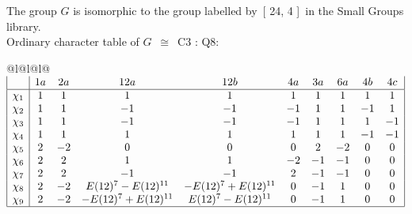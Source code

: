 \documentclass[varwidth=\maxdimen,border=10]{standalone}
\begin{document}
The group $G$ is isomorphic to the group labelled by\ [ 24, 4 ]\ in the Small Groups library.\\
Ordinary character table of $G$\ $\cong$\ C3 : Q8:\\
\begin{center}
\begin{tabular}{@{}l@{}l@{}l@{}}
\hline
\(\begin{array}{|l|ccccccccc|}
  & 1a & 2a & 12a & 12b & 4a & 3a & 6a & 4b & 4c\\ \hline
\chi_{1} & 1 & 1 & 1 & 1 & 1 & 1 & 1 & 1 & 1\\
\chi_{2} & 1 & 1 & -1 & -1 & -1 & 1 & 1 & -1 & 1\\
\chi_{3} & 1 & 1 & -1 & -1 & -1 & 1 & 1 & 1 & -1\\
\chi_{4} & 1 & 1 & 1 & 1 & 1 & 1 & 1 & -1 & -1\\
\chi_{5} & 2 & -2 & 0 & 0 & 0 & 2 & -2 & 0 & 0\\
\chi_{6} & 2 & 2 & 1 & 1 & -2 & -1 & -1 & 0 & 0\\
\chi_{7} & 2 & 2 & -1 & -1 & 2 & -1 & -1 & 0 & 0\\
\chi_{8} & 2 & -2 & E(12)^{7}-E(12)^{11} & -E(12)^{7}+E(12)^{11} & 0 & -1 & 1 & 0 & 0\\
\chi_{9} & 2 & -2 & -E(12)^{7}+E(12)^{11} & E(12)^{7}-E(12)^{11} & 0 & -1 & 1 & 0 & 0\\
\hline
\end{array}\)\\
\end{tabular}
\end{center}
\end{document}
